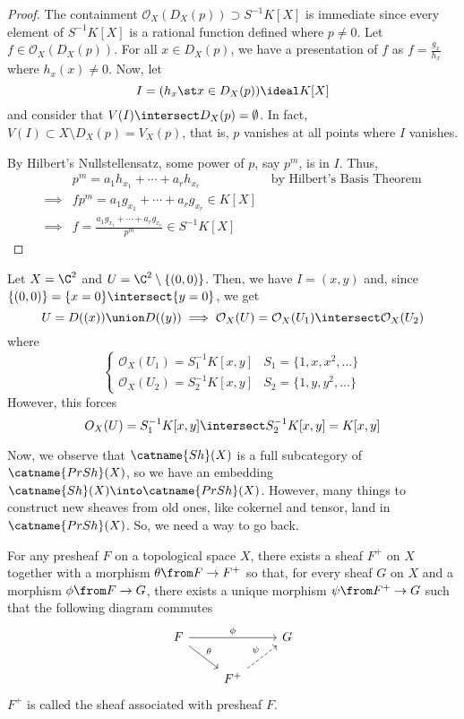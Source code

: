 \documentclass[11pt,leqno,oneside]{amsbook}
\renewcommand{\F}{F}
\newcommand{\G}{G}
\renewcommand{\O}{\mathcal{O}}
\numberwithin{thm}{section}
\begin{document}
\begin{proof}
  The containment \(\O_X(D_X(p)) \supset S^{-1}K[X]\) is immediate
  since every element of \(S^{-1}K[X]\) is a rational function defined
  where \(p \neq 0\). Let \(f \in \O_X(D_X(p))\). For all \(x \in
  D_X(p)\), we have a presentation of \(f\) as \(f = \frac{g_x}{h_x}\)
  where \(h_x(x) \neq 0\). Now, let \[
    I = (h_x \st x \in D_X(p)) \ideal K[X]
  \]
  and consider that \(V(I) \intersect D_X(p) = \emptyset\). In fact,
  \(V(I) \subset X \setminus D_X(p) = V_X(p)\), that is, \(p\)
  vanishes at all points where \(I\) vanishes.

  By Hilbert's Nullstellensatz, some power of \(p\), say \(p^m\), is
  in \(I\). Thus,
  \begin{align*}
    & p^m = a_1 h_{x_1} + \cdots + a_r h_{x_r} & \text{ by Hilbert's
                                                 Basis Theorem} \\
    \implies & fp^m = a_1 g_{x_1} + \cdots + a_r g_{x_r} \in K[X] \\
    \implies & f = \frac{a_1 g_{x_1} + \cdots + a_r g_{x_r}}{p^m} \in S^{-1}K[X]
  \end{align*}
\end{proof}
\begin{example}
  Let \(X = \C^2\) and \(U = \C^2 \setminus \{(0,0)\}\). Then, we have
  \(I = (x,y)\) and, since \(\{(0,0)\} = \{x=0\} \intersect \{y=0\}\),
  we get \[
    U = D((x)) \union D((y)) \implies \O_X(U) = \O_X(U_1) \intersect \O_X(U_2)
  \]
  where \[
    \begin{cases}
      \O_X(U_1) = S_1^{-1}K[x,y] & S_1 = \{1,x,x^2,\ldots\} \\
      \O_X(U_2) = S_2^{-1}K[x,y] & S_2 = \{1,y,y^2,\ldots\}
    \end{cases}
  \]
  However, this forces \[
    O_X(U) = S_1^{-1}K[x,y] \intersect S_2^{-1}K[x,y] = K[x,y]
  \]
\end{example}
Now, we observe that \(\catname{Sh}(X)\) is a full subcategory of
\(\catname{PrSh}(X)\), so we have an embedding \(\catname{Sh}(X) \into
\catname{PrSh}(X)\). However, many things to construct new sheaves
from old ones, like cokernel and tensor, land in
\(\catname{PrSh}(X)\). So, we need a way to go back.
\begin{thm}
  For any presheaf \(\F\) on a topological space \(X\), there exists a
  sheaf \(\F^+\) on \(X\) together with a morphism \(\theta \from \F
  \to \F^+\) so that, for every sheaf \(\G\) on \(X\) and a morphism
  \(\phi \from \F \to G\), there exists a unique morphism \(\psi \from
  \F^+ \to G\) such that the following diagram commutes \[
    \begin{tikzcd}
      \F \ar[rd, "\theta"] \ar[rr,"\phi"] & & \G \\
      & \F^+ \ar[ru, dashed, "\psi"]
    \end{tikzcd}
  \]
  \(\F^+\) is called the sheaf associated with presheaf \(\F\).
\end{thm}
\end{document}
